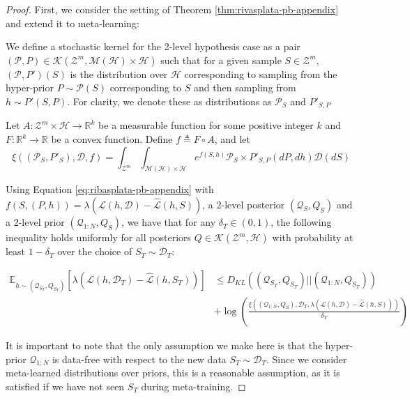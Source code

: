 \documentclass{article}
\theoremstyle{definition}
\newcommand{\Expect}[2]{\mathbb{E}_{#1}\left [#2 \right ]}
\begin{document}
\begin{proof}
	First, we consider the setting of Theorem \ref{thm:rivasplata-pb-appendix} and extend it to meta-learning:
	
	We define a stochastic kernel for the 2-level hypothesis case as a pair $(\mathcal{P},P)\in \mathcal{K}(\mathcal{Z}^m, \mathcal{M}(\mathcal{H})\times \mathcal{H})$ such that for a given sample $S\in \mathcal{Z}^m$,  $(\mathcal{P},P')(S)$ is the distribution over $\mathcal{H}$ corresponding to sampling from the hyper-prior $P\sim \mathcal{P}(S)$ corresponding to $S$ and then sampling from $h\sim P'(S, P)$. For clarity, we denote these as distributions as $\mathcal{P}_S$ and $P'_{S,P}$
	
	Let $A: \mathcal{Z}^m\times \mathcal{H}\rightarrow \mathbb{R}^k$ be a measurable function for some positive integer $k$ and $F:\mathbb{R}^k\rightarrow \mathbb{R}$ be a convex function.
	Define $f\triangleq F\circ A$, and let 
	$$\xi((\mathcal{P}_S,P'_S), \mathcal{D}, f)=\int_{\mathcal{Z}^m}\int_{\mathcal{M}(\mathcal{H})\times\mathcal{H}}e^{f(S, h)}\mathcal{P}_S\times P'_{S,P}(dP,dh)\mathcal{D}(dS)$$
	
	Using Equation \ref{eq:ribasplata-pb-appendix} with $f(S,(P,h))=\lambda(\mathcal{L}(h,\mathcal{D})-\hat{\mathcal{L}}(h,S))$, a 2-level posterior $(\mathcal{Q}_S, Q_S)$ and a 2-level prior $(\mathcal{Q}_{1:N}, Q_S)$,
	we have that for any $\delta_T \in (0,1)$, the following inequality holds uniformly for all posteriors $Q\in \mathcal{K}(\mathcal{Z}^m, \mathcal{H})$ with probability at least $1-\delta_T$ over the choice of $S_T\sim \mathcal{D}_T$:
	
	\begin{equation} \label{eq:appendix-proof-eq}
	\begin{split}
	\Expect{h\sim (\mathcal{Q}_{S_T}, Q_{S_T})}{\lambda(\mathcal{L}(h,\mathcal{D}_T)-\hat{\mathcal{L}}(h,S_T))} &\leq D_{KL}((\mathcal{Q}_{S_T}, Q_{S_T})||(\mathcal{Q}_{1:N}, Q_{S_T}))\\
	&+\log\left (\frac{\xi\left ((\mathcal{Q}_{1:N}, Q_S), \mathcal{D}_T, \lambda(\mathcal{L}(h,\mathcal{D})-\hat{\mathcal{L}}(h,S))\right )}{\delta_T}\right )
	\end{split}
	\end{equation}
	
	It is important to note that the only assumption we make here is that the hyper-prior $\mathcal{Q}_{1:N}$ is data-free with respect to the new data $S_T\sim \mathcal{D}_T$. Since we consider meta-learned distributions over priors, this is a reasonable assumption, as it is satisfied if we have not seen $S_T$ during meta-training.
	

\end{proof}
\end{document}
